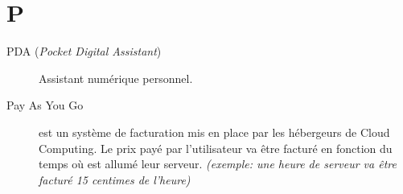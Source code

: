 \section{P}

\begin{description}

\item[PDA (\textsl{Pocket Digital Assistant})]
Assistant numérique personnel.

\item[Pay As You Go] est un système de facturation mis en place par les hébergeurs
de Cloud Computing. Le prix payé par l'utilisateur va être facturé en fonction du
temps où est allumé leur serveur. \textit{(exemple: une heure de serveur va être 
facturé 15 centimes de l'heure)}


\end{description}
